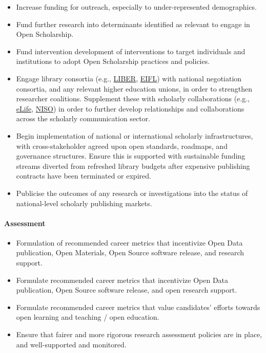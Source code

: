 \begin{itemize}
\item
  Increase funding for outreach, especially to under-represented
  demographics.
\item
  Fund further research into determinants identified as relevant to
  engage in Open Scholarship.
\item
  Fund intervention development of interventions to target individuals
  and institutions to adopt Open Scholarship practices and policies.
\item
  Engage library consortia (e.g., \href{https://liber2016.org/}{LIBER},
  \href{http://www.eifl.net/}{EIFL}) with national negotiation
  consortia, and any relevant higher education unions, in order to
  strengthen researcher coalitions. Supplement these with scholarly
  collaborations (e.g., \href{https://elifesciences.org/}{eLife},
  \href{https://www.niso.org/}{NISO}) in order to further develop
  relationships and collaborations across the scholarly communication
  sector.
\item
  Begin implementation of national or international scholarly
  infrastructures, with cross-stakeholder agreed upon open standards,
  roadmaps, and governance structures. Ensure this is supported with
  sustainable funding streams diverted from refreshed library budgets
  after expensive publishing contracts have been terminated or expired.
\item
  Publicise the outcomes of any research or investigations into the
  status of national-level scholarly publishing markets.
\end{itemize}

\paragraph{Assessment}\label{assessment-4}

\begin{itemize}
\item
  Formulation of recommended career metrics that incentivize Open Data
  publication, Open Materials, Open Source software release, and
  research support.
\item
  Formulate recommended career metrics that incentivize Open Data
  publication, Open Source software release, and open research support.
\item
  Formulate recommended career metrics that value candidates' efforts
  towards open learning and teaching / open education.
\item
  Ensure that fairer and more rigorous research assessment policies are
  in place, and well-supported and monitored.
\end{itemize}

